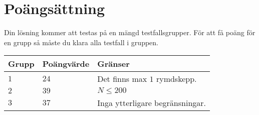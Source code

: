 \section*{Poängsättning}
Din lösning kommer att testas på en mängd testfallsgrupper.
För att få poäng för en grupp så måste du klara alla testfall i gruppen.

\noindent
\begin{tabular}{| l | l | l |}
\hline
Grupp & Poängvärde & Gränser \\ \hline
$1$   & $24$       & Det finns max $1$ rymdskepp. \\ \hline
$2$   & $39$       & $N \leq 200$ \\ \hline
$3$   & $37$       & Inga ytterligare begränsningar. \\ \hline
\end{tabular}
